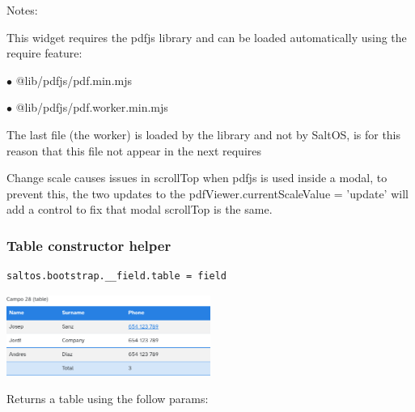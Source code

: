 \documentclass[a4paper]{article}
\begin{document}
Notes:

This widget requires the pdfjs library and can be loaded automatically using the require
feature:

\begin{compactitem}
\item[\color{myblue}$\bullet$] @lib/pdfjs/pdf.min.mjs
\item[\color{myblue}$\bullet$] @lib/pdfjs/pdf.worker.min.mjs
\end{compactitem}

The last file (the worker) is loaded by the library and not by SaltOS, is for this reason
that this file not appear in the next requires

Change scale causes issues in scrollTop when pdfjs is used inside a modal, to prevent this,
the two updates to the pdfViewer.currentScaleValue = 'update' will add a control to fix
that modal scrollTop is the same.

\hypertarget{toc75}{}
\subsubsection{Table constructor helper}

\begin{lstlisting}
saltos.bootstrap.__field.table = field
\end{lstlisting}

\begin{center}\includegraphics[width=0.5\textwidth]{../ujest/snaps/test-bootstrap-js-bootstrap-campo-28-table-1-snap.png}\end{center}

Returns a table using the follow params:
\end{document}
